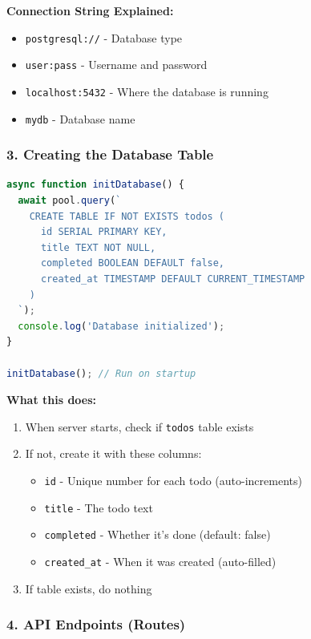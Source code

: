\documentclass[12pt,a4paper]{article}
\begin{document}
\textbf{Connection String Explained:}
\begin{itemize}
    \item \texttt{postgresql://} - Database type
    \item \texttt{user:pass} - Username and password
    \item \texttt{localhost:5432} - Where the database is running
    \item \texttt{mydb} - Database name
\end{itemize}

\subsubsection{3. Creating the Database Table}

\begin{lstlisting}[language=JavaScript, caption=Database Initialization]
async function initDatabase() {
  await pool.query(`
    CREATE TABLE IF NOT EXISTS todos (
      id SERIAL PRIMARY KEY,
      title TEXT NOT NULL,
      completed BOOLEAN DEFAULT false,
      created_at TIMESTAMP DEFAULT CURRENT_TIMESTAMP
    )
  `);
  console.log('Database initialized');
}

initDatabase(); // Run on startup
\end{lstlisting}

\textbf{What this does:}
\begin{enumerate}
    \item When server starts, check if \texttt{todos} table exists
    \item If not, create it with these columns:
    \begin{itemize}
        \item \texttt{id} - Unique number for each todo (auto-increments)
        \item \texttt{title} - The todo text
        \item \texttt{completed} - Whether it's done (default: false)
        \item \texttt{created\_at} - When it was created (auto-filled)
    \end{itemize}
    \item If table exists, do nothing
\end{enumerate}

\subsubsection{4. API Endpoints (Routes)}
\end{document}
